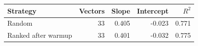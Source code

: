 \begin{tabular}{lrrrr}
\toprule
Strategy & Vectors & Slope & Intercept & $R^2$ \\
\midrule
Random & 33 & 0.405 & -0.023 & 0.771 \\
Ranked after warmup & 33 & 0.401 & -0.032 & 0.775 \\
\bottomrule
\end{tabular}
